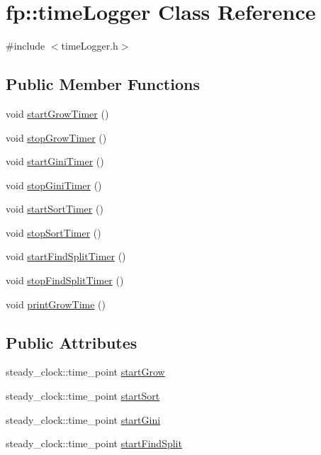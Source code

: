 \hypertarget{classfp_1_1timeLogger}{}\section{fp\+:\+:time\+Logger Class Reference}
\label{classfp_1_1timeLogger}


{\ttfamily \#include $<$time\+Logger.\+h$>$}

\subsection*{Public Member Functions}
\begin{DoxyCompactItemize}
\item 
void \hyperlink{classfp_1_1timeLogger_ab6ae96d6c08b46531417915f1b120060}{start\+Grow\+Timer} ()
\item 
void \hyperlink{classfp_1_1timeLogger_a4ce75092aa7c974da223425e921312a6}{stop\+Grow\+Timer} ()
\item 
void \hyperlink{classfp_1_1timeLogger_a706a97bf8610b4fd6196352b8e38b48b}{start\+Gini\+Timer} ()
\item 
void \hyperlink{classfp_1_1timeLogger_ad5a58f08214d4d48b4740685506c130f}{stop\+Gini\+Timer} ()
\item 
void \hyperlink{classfp_1_1timeLogger_a53d2260809f92b6884e6cbf4cdf89c2e}{start\+Sort\+Timer} ()
\item 
void \hyperlink{classfp_1_1timeLogger_a69923048ee4739b4da9581000775fd2a}{stop\+Sort\+Timer} ()
\item 
void \hyperlink{classfp_1_1timeLogger_a59d92a31ff5b1c845dddcc1836323769}{start\+Find\+Split\+Timer} ()
\item 
void \hyperlink{classfp_1_1timeLogger_a99c7751d29c3a180fca00564089b9de7}{stop\+Find\+Split\+Timer} ()
\item 
void \hyperlink{classfp_1_1timeLogger_a0fc73becc2212e5518d300c514855798}{print\+Grow\+Time} ()
\end{DoxyCompactItemize}
\subsection*{Public Attributes}
\begin{DoxyCompactItemize}
\item 
steady\+\_\+clock\+::time\+\_\+point \hyperlink{classfp_1_1timeLogger_a530aa42af210e19fbab96c998271dbc4}{start\+Grow}
\item 
steady\+\_\+clock\+::time\+\_\+point \hyperlink{classfp_1_1timeLogger_afed53c702d6f414558eb7ca49f37ff22}{start\+Sort}
\item 
steady\+\_\+clock\+::time\+\_\+point \hyperlink{classfp_1_1timeLogger_abe0bd7eeb79ad8c33747afb4f4a99e88}{start\+Gini}
\item 
steady\+\_\+clock\+::time\+\_\+point \hyperlink{classfp_1_1timeLogger_a1783656ae0d2e107cdfa87766ddc1a8c}{start\+Find\+Split}
\end{DoxyCompactItemize}
